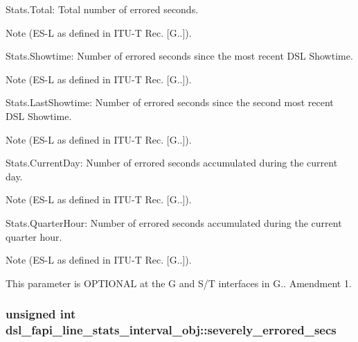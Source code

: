 \begin{DoxyItemize}
\item Stats.\-Total\-: Total number of errored seconds. \begin{DoxyNote}{Note}
(E\-S-\/\-L as defined in I\-T\-U-\/\-T Rec. \mbox{[}G..\mbox{]}).
\end{DoxyNote}

\item Stats.\-Showtime\-: Number of errored seconds since the most recent D\-S\-L Showtime. \begin{DoxyNote}{Note}
(E\-S-\/\-L as defined in I\-T\-U-\/\-T Rec. \mbox{[}G..\mbox{]}).
\end{DoxyNote}

\item Stats.\-Last\-Showtime\-: Number of errored seconds since the second most recent D\-S\-L Showtime. \begin{DoxyNote}{Note}
(E\-S-\/\-L as defined in I\-T\-U-\/\-T Rec. \mbox{[}G..\mbox{]}).
\end{DoxyNote}

\item Stats.\-Current\-Day\-: Number of errored seconds accumulated during the current day. \begin{DoxyNote}{Note}
(E\-S-\/\-L as defined in I\-T\-U-\/\-T Rec. \mbox{[}G..\mbox{]}).
\end{DoxyNote}

\item Stats.\-Quarter\-Hour\-: Number of errored seconds accumulated during the current quarter hour. \begin{DoxyNote}{Note}
(E\-S-\/\-L as defined in I\-T\-U-\/\-T Rec. \mbox{[}G..\mbox{]}). 

This parameter is O\-P\-T\-I\-O\-N\-A\-L at the G and S/\-T interfaces in G.. Amendment 1. 
\end{DoxyNote}

\end{DoxyItemize}\hypertarget{structdsl__fapi__line__stats__interval__obj_aa33dade3d0503936c3f3cabc64447b8e}{
\subsubsection[{severely\-\_\-errored\-\_\-secs}]{\setlength{\rightskip}{0pt plus 5cm}unsigned int dsl\-\_\-fapi\-\_\-line\-\_\-stats\-\_\-interval\-\_\-obj\-::severely\-\_\-errored\-\_\-secs}}\label{structdsl__fapi__line__stats__interval__obj_aa33dade3d0503936c3f3cabc64447b8e}
